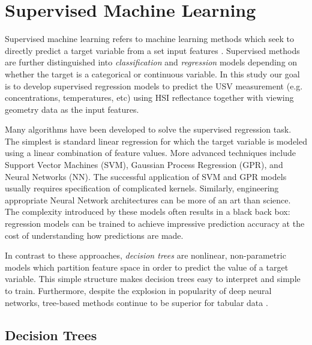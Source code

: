 \section{Supervised Machine Learning}

Supervised machine learning refers to machine learning methods which
seek to directly predict a target variable from a set input features
\cite{bishop-prml}. Supervised methods are further distinguished into
\textit{classification} and \textit{regression} models depending on whether the
target is a categorical or continuous variable. In this study our goal is to
develop supervised regression models to predict the USV measurement (e.g.
concentrations, temperatures, etc) using HSI reflectance together with viewing
geometry data as the input features.

Many algorithms have been developed to solve the supervised regression task. The
simplest is standard linear regression for which the target variable is modeled
using a linear combination of feature values. More advanced techniques include
Support Vector Machines (SVM), Gaussian Process Regression (GPR), and Neural
Networks (NN). The successful application of SVM and GPR models usually requires
specification of complicated kernels. Similarly, engineering appropriate Neural
Network architectures can be more of an art than science. The complexity
introduced by these models often results in a black back box: regression models
can be trained to achieve impressive prediction accuracy at the cost of
understanding how predictions are made.

In contrast to these approaches, \textit{decision trees} are nonlinear,
non-parametric models which partition feature space in order to predict the
value of a target variable. This simple structure makes decision trees easy to
interpret and simple to train. Furthermore, despite the explosion in popularity
of deep neural networks, tree-based methods continue to be superior for tabular
data \cite{grinsztajn2022tree, shwartz2022tabular}.

\subsection{Decision Trees}


